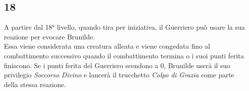 \subsection{18}
A partire dal 18° livello, quando tira per iniziativa, il Guerriero può usare la sua reazione per evocare Brunilde. \\ Essa viene considerata una creatura alleata e viene congedata fino al combattimento successivo quando il combattimento termina o i suoi punti ferita finiscono. Se i punti ferita del Guerriero scendono a 0, Brunilde userà il suo privilegio \textit{Soccorso Divino} e lancerà il trucchetto \textit{Colpo di Grazia} come parte della stessa reazione.

